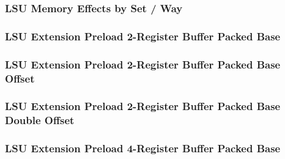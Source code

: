 

\subsubsection[{\small LSU Memory Effects by Set / Way}]{LSU Memory Effects by Set / Way} \label{sec:format-LSU-FXSW}



\subsubsection[{\small LSU Extension Preload 2-Register Buffer Packed Base}]{LSU Extension Preload 2-Register Buffer Packed Base} \label{sec:format-LSU-XPL2RBB}



\subsubsection[{\small LSU Extension Preload 2-Register Buffer Packed Base Offset}]{LSU Extension Preload 2-Register Buffer Packed Base Offset} \label{sec:format-LSU-XPL2RBB.O}



\subsubsection[{\small LSU Extension Preload 2-Register Buffer Packed Base Double Offset}]{LSU Extension Preload 2-Register Buffer Packed Base Double Offset} \label{sec:format-LSU-XPL2RBB.D}



\subsubsection[{\small LSU Extension Preload 4-Register Buffer Packed Base}]{LSU Extension Preload 4-Register Buffer Packed Base} \label{sec:format-LSU-XPL4RBB}


